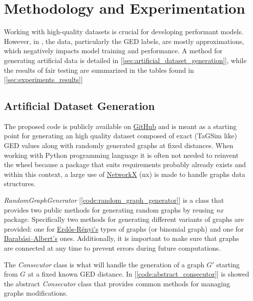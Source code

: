 \documentclass[../Thesis.tex]{subfiles}
\begin{document}
	\section{Methodology and Experimentation}
	\label{sec:methodology_and_experimentation}
	
	Working with high-quality datasets is crucial for developing performant models. However, in \cite{computing_graph_edit_distance_via_neural_graph_matching}, the data, particularly the GED labels, are mostly approximations, which negatively impacts model training and performance. A method for generating artificial data is detailed in [\autoref{sec:artificial_dataset_generation}], while the results of fair testing are summarized in the tables found in [\autoref{sec:experiments_results}]
	
	\subsection{Artificial Dataset Generation}
	\label{sec:artificial_dataset_generation}

	The proposed code is publicly available on \href{https://github.com/FedericoCalabro/gnnged/blob/vldb/1.%20synthetic_dataset_v2.ipynb}{GitHub} and is meant as a starting point for generating an high quality dataset composed of exact (TaGSim like) GED values along with randomly generated graphs at fixed distances.
	When working with Python programming language it is often not needed to reinvent the wheel because a package that suits requirements probably already exists and within this context, a large use of \href{https://networkx.org/}{NetworkX} (nx) is made to handle graphs data structures.
	
	
	\textit{RandomGraphGenerator} [\autoref{code:random_graph_generator}] is a class that provides two public methods for generating random graphs by reusing \textit{nx} package. Specifically two methods for generating different variants of graphs are provided: one for \href{https://en.wikipedia.org/wiki/Erd%C5%91s%E2%80%93R%C3%A9nyi_model}{Erdős-Rényi's} types of graphs (or binomial graph) and one for \href{https://en.wikipedia.org/wiki/Barab%C3%A1si%E2%80%93Albert_model}{Barabási–Albert's} ones. Additionally, it is important to make sure that graphs are connected at any time to prevent errors during future computations. 
	
	
	The \textit{Consecutor} class is what will handle the generation of a graph $G'$ starting from $G$ at a fixed known GED distance. In [\autoref{code:abstract_consecutor}] is showed the abstract \textit{Consecutor} class that provides common methods for managing graphs modifications.
	
\end{document}
